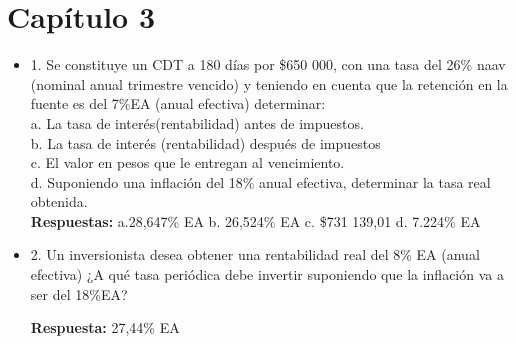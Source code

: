 \chapter*{Capítulo 3}


\begin{itemize}
	
	\item 1. Se  constituye  un  CDT  a  180  días  por  \$650  000,  con  una  tasa  del  26\% naav  (nominal  anual  trimestre  vencido)  y  teniendo  en  cuenta  que  la retención en la fuente es del 7\%EA (anual efectiva) determinar:\\ 
	
	a. La tasa de interés(rentabilidad) antes de impuestos.\\
	b. La tasa de interés (rentabilidad) después de impuestos\\
	c. El valor en pesos que le entregan al vencimiento.\\
	d. Suponiendo una inflación del 18\% anual efectiva, determinar la tasa real obtenida.\\
	
	\textbf{Respuestas:} a.28,647\%  EA\hspace{0,5cm} b. 26,524\%  EA\hspace{0,5cm} c. \$731 139,01 d. 7.224\% EA\\
	\medskip
	
	\item 2. Un  inversionista  desea  obtener  una  rentabilidad  real  del  8\%  EA  (anual efectiva) ¿A qué tasa periódica debe invertir suponiendo que la inflación va a ser del 18\%EA?
	\medskip
	
	\textbf{Respuesta:} 27,44\% EA\\
	\medskip
	

\end{itemize}

